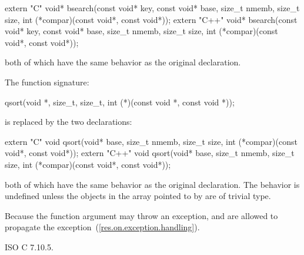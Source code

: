 \begin{codeblock}
extern "C" void* bsearch(const void* key, const void* base,
                         size_t nmemb, size_t size,
                         int (*compar)(const void*, const void*));
extern "C++" void* bsearch(const void* key, const void* base,
                           size_t nmemb, size_t size,
                           int (*compar)(const void*, const void*));
\end{codeblock}

both of which have the same behavior as the original declaration.

\pnum
The function signature:

\begin{codeblock}
qsort(void *, size_t, size_t,
  int (*)(const void *, const void *));
\end{codeblock}

is replaced by the two declarations:

\begin{codeblock}
extern "C" void qsort(void* base, size_t nmemb, size_t size,
                      int (*compar)(const void*, const void*));
extern "C++" void qsort(void* base, size_t nmemb, size_t size,
                        int (*compar)(const void*, const void*));
\end{codeblock}

both of which have the same behavior as the original declaration. The behavior is
undefined unless the objects in the array pointed to by  are of trivial type.

\enternote
Because the function argument  may throw an exception,
and
are allowed to propagate the exception~(\ref{res.on.exception.handling}).
\exitnote

\xref
ISO C 7.10.5.
